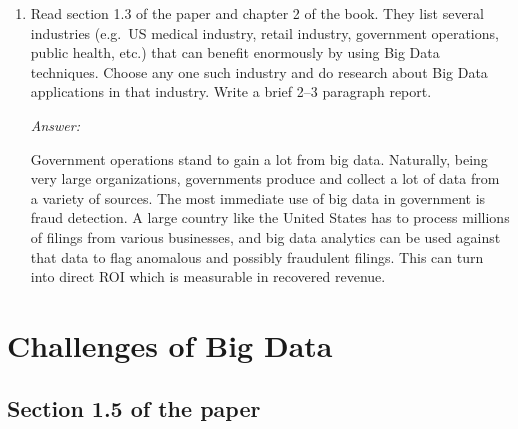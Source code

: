 \documentclass[11pt]{article}
\newcommand{\answer}{\vspace{0.25em}\par\textit{Answer:}\vspace{0.25em}\par}
\begin{document}
\begin{enumerate}
  \item Read section 1.3 of the paper and chapter 2 of the book. They
    list several industries
    (e.g.\ US medical industry, retail industry, government
    operations, public health, etc.)
    that can benefit enormously by using Big Data techniques. Choose
    any one such industry
    and do research about Big Data applications in that industry.
    Write a brief 2--3
    paragraph report.
    \answer Government operations stand to gain a lot from big data.
    Naturally, being very large organizations, governments produce
    and collect a lot of data from a variety of sources. The most
    immediate use of big data in government is fraud detection. A
    large country like the United States has to process millions of filings from
    various businesses, and big data analytics can be used against
    that data to flag anomalous and possibly fraudulent filings. This
    can turn into direct ROI which is measurable in recovered revenue.
\end{enumerate}

\section{Challenges of Big Data}

\subsection*{Section 1.5 of the paper}
\end{document}
